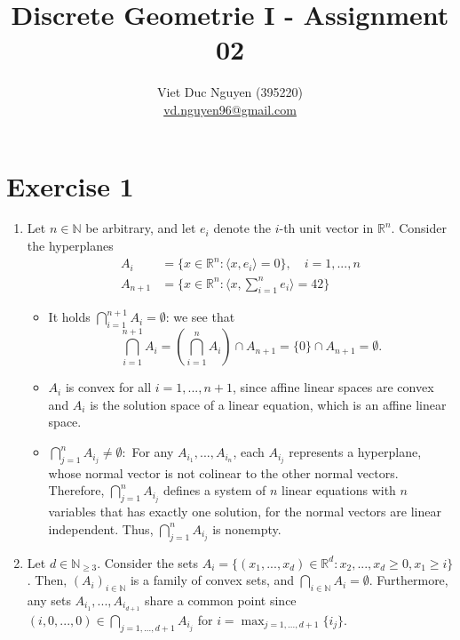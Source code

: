 \documentclass{article}
\title{Discrete Geometrie I - Assignment 02}
\date{}
\author{Viet Duc Nguyen (395220)\\
    \underline{vd.nguyen96@gmail.com}
}
\begin{document}
\maketitle

\section*{Exercise 1}
\begin{enumerate}[label=(\alph*)]
    \item Let $n \in \mathbb N$ be arbitrary, and let $e_i$ denote the $i$-th unit vector in $\mathbb R^n$. Consider the hyperplanes 
    \begin{align*}
        A_i &= \{ x \in \mathbb R^n : \langle x,e_i \rangle = 0 \}, \quad i = 1,...,n \\
        A_{n+1} &= \{ x \in \mathbb R^n: \langle x,\sum_{i=1}^ne_i \rangle = 42 \}
    \end{align*}
    \begin{itemize}
        \item It holds $\bigcap_{i=1}^{n+1} A_i = \emptyset$: we see that $$\bigcap_{i=1}^{n+1} A_i = \left(\bigcap^n_{i=1} A_i\right) \cap A_{n+1} = \{0\} \cap A_{n+1} = \emptyset.$$

        \item $A_i$ is convex for all $i=1,...,n+1$, since affine linear spaces are convex and $A_i$ is the solution space of a linear equation, which is an affine linear space.
        
        \item $\bigcap_{j=1}^n A_{i_j} \neq \emptyset:$ For any $A_{i_1},...,A_{i_n}$, each $A_{i_j}$ represents a hyperplane, whose normal vector is not colinear to the other normal vectors. Therefore, $\bigcap_{j=1}^n A_{i_j}$ defines a system of $n$ linear equations with $n$ variables that has exactly one solution, for the normal vectors are linear independent. Thus, $\bigcap_{j=1}^n A_{i_j}$ is nonempty.
    \end{itemize}
    
    

    \item Let $d \in \mathbb N_{\geq 3}$. Consider the sets $A_i = \{ (x_1,...,x_d) \in \mathbb R^d : x_2,...,x_{d} \geq 0, x_1 \geq i \}$. Then, $(A_i)_{i \in \mathbb N}$ is a family of convex sets, and $\bigcap_{i \in \mathbb N} A_i = \emptyset$. Furthermore, any sets $A_{i_1},...,A_{i_{d+1}}$ share a common point since $(i,0,...,0) \in \bigcap_{j=1,...,d+1} A_{i_j}$ for $i = \max_{j=1,...,d+1}\{i_j \}$.
\end{enumerate}
\end{document}
